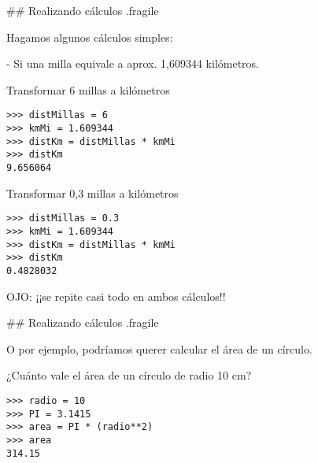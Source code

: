 ## Realizando cálculos {.fragile}

Hagamos algunos cálculos simples:

- Si una milla equivale a aprox. 1,609344 kilómetros.

\vspace*{-1em}
\bgncolumns


\bgnblocknormal[wd=.7\textwidth,centered=true]
Transformar 6 millas a kilómetros
\trmblocknormal

\vspace{-2ex}
\begin{lstlisting}[linebackgroundcolor={\btLstHL<3->{2-3}}]
>>> distMillas = 6
>>> kmMi = 1.609344
>>> distKm = distMillas * kmMi
>>> distKm
9.656064
\end{lstlisting}
\trmcolumns

\pause

\vspace{1ex}
\bgncolumns
{}

\bgnblocknormal[wd=.7\textwidth,centered=true]
Transformar 0,3 millas a kilómetros
\trmblocknormal

\vspace{-2ex}
\begin{lstlisting}[linebackgroundcolor={\btLstHL<3->{2-3}}]
>>> distMillas = 0.3
>>> kmMi = 1.609344
>>> distKm = distMillas * kmMi
>>> distKm
0.4828032
\end{lstlisting}

\trmcolumns

\pause
\bgnblockdanger
OJO: ¡¡se repite casi todo en ambos cálculos!!
\trmblockdanger

## Realizando cálculos {.fragile}

O por ejemplo, podríamos querer calcular el área de un círculo.

\bgncolumns


\bgnblocknormal[wd=.7\textwidth,centered=true]
¿Cuánto vale el área de un círculo de radio 10 cm?
\trmblocknormal

\vspace{-2ex}
\begin{lstlisting}[linebackgroundcolor={\btLstHL<3->{2-3}}]
>>> radio = 10
>>> PI = 3.1415
>>> area = PI * (radio**2)
>>> area
314.15
\end{lstlisting}

\trmcolumns

